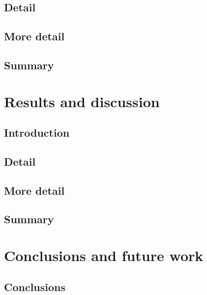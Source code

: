 	\subsection{Detail}
    \lipsum[1-2] \cite{ref:jCAS10,ref:jCAS09,ref:jCAS09a} \lipsum[3-5] 
    
	\subsection{More detail}
	\lipsum[1-2] \cite{ref:jCAS10,ref:jCAS09,ref:jCAS09a} \lipsum[3-5]
	
	\subsection{Summary}
	\lipsum[1]  


\section{Results and discussion} %
    \subsection{Introduction}
	\lipsum[1]
	
	\subsection{Detail}
    \lipsum[1-2] \cite{ref:jCAS10,ref:jCAS09,ref:jCAS09a} \lipsum[3-5]
    
	\subsection{More detail}
	\lipsum[1-2] \cite{ref:jCAS10,ref:jCAS09,ref:jCAS09a} \lipsum[3-5]
	
	\subsection{Summary}
	\lipsum[1]



\section{Conclusions and future work} %
    \subsection{Conclusions}
	\lipsum[1]
	
